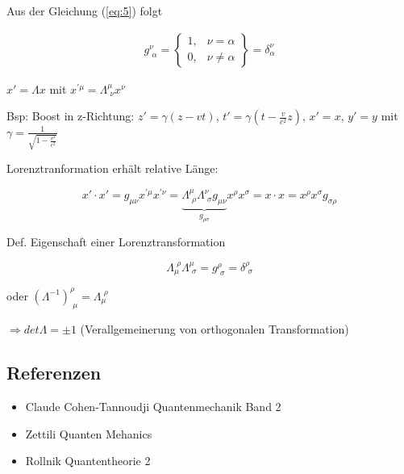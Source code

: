 Aus der Gleichung (\ref{eq:5}) folgt

\begin{align}
  \label{eq:6}
  g^\nu_{\,\,\alpha} = \begin{Bmatrix} 1,& \nu = \alpha\\ 0,&\nu\neq\alpha \end{Bmatrix} = \delta^\nu_{\alpha}
\end{align}




\(x' = \Lambda x\)  mit \(x^{'\mu}=\Lambda^\mu_{\,\, \nu}x^\nu\)

Bsp: Boost in z-Richtung: \(z' = \gamma(z-vt)\), \(t' = \gamma(t-\frac{v}{c^2}z)\), \(x' = x\), \(y'=y\) mit \(\gamma = \frac{1}{\sqrt{1-\frac{v^2}{c^2}}}\)

Lorenztranformation erhält relative Länge:

\[x'\cdot x' = g_{\mu\nu}x^{'\mu}x^{'\nu} = \underbrace{\Lambda^\mu_{\,\, \rho}  \Lambda^\nu_{\,\, \sigma}g_{\mu\nu}}_{g_{\rho\sigma}}x^\rho x^\sigma = x\cdot x = x^\rho x^\sigma g_{\sigma\rho}\]

Def. Eigenschaft einer Lorenztransformation

\[\Lambda_\mu^{\,\, \rho}\Lambda^\mu_{\,\,\sigma} = g^\rho_{\,\,\sigma} = \delta^\rho_{\,\, \sigma}  \]

oder \((\Lambda^{-1})^\rho_{\,\,\mu} = \Lambda_\mu^{\,\,\rho}\)

\(\Rightarrow det\Lambda = \pm 1\) (Verallgemeinerung von orthogonalen Transformation)








\subsection*{Referenzen}
\begin{itemize}
\item Claude Cohen-Tannoudji Quantenmechanik Band 2
\item Zettili Quanten Mehanics
\item Rollnik Quantentheorie 2
\end{itemize}


